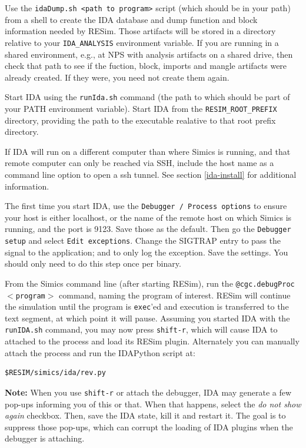 \documentclass[titlepage]{article}
\begin{document}
Use the {\tt idaDump.sh <path to program>} script (which should be in your path) from a shell to create the IDA database and dump function and block information
needed by RESim.  Those artifacts will be stored in a directory relative to your {\tt IDA\_ANALYSIS} environment variable.
If you are running in a shared environment, e.g., at NPS with analysis artifacts on a shared drive, then 
check that path to see if the fuction, block, imports and mangle artifacts were already created.  If they were, you need not create them again.

Start IDA using the {\tt runIda.sh} command (the path to which should be part of your PATH environment variable).  Start IDA from the
{\tt RESIM\_ROOT\_PREFIX} directory, providing the path to the executable realative to that root prefix directory.

If IDA will run on a different computer than where Simics is running, and that remote computer can only be reached via SSH, include the host 
name as a command line option to open a ssh tunnel.  See section \ref{ida-install} for additional information.

The first time you start IDA, use the {\tt Debugger / Process options} to ensure your host is either localhost, or the name of the remote host
on which Simics is running, and the port is 9123.  Save those as 
the default.  Then go the {\tt Debugger setup} and select {\tt Edit exceptions}.  Change the SIGTRAP entry to pass the signal to the application;
and to only log the exception.  Save the settings.  You should only need to do this step once per binary.

From the Simics command line (after starting RESim), run the {\tt @cgc.debugProc$<$program$>$} command, naming the program of interest.
RESim will continue the simulation until the program is {\tt exec}'ed and execution is transferred to the text segment, at which point it will pause.
Assuming you started IDA with the {\tt runIDA.sh} command, you may now press {\tt shift-r}, which will cause IDA to attached to the
process and load its RESim plugin.  Alternately you can manually attach the process and run the IDAPython script at:
\begin{verbatim}
$RESIM/simics/ida/rev.py
\end{verbatim}

\noindent \textbf{Note:} When you use {\tt shift-r} or attach the debugger, IDA may generate a few pop-ups informing you of this or that.  When that happens, select the 
\textit{do not show again} checkbox.  Then, save the IDA state, kill it and restart it.  The goal is to suppress those pop-ups, which can corrupt the
loading of IDA plugins when the debugger is attaching.
\end{document}
